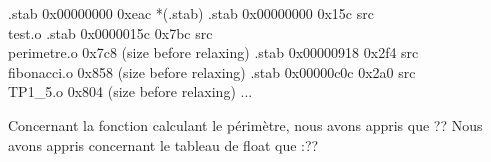 \documentclass[12pt,a4paper]{article}
\begin{document}
\begin{framed}
{.stab           0x00000000      0xeac\newline
 *(.stab)
 \color{blue}
 .stab          0x00000000      0x15c src\\test.o \newline
 .stab          0x0000015c      0x7bc src\\perimetre.o\newline
                                0x7c8 (size before relaxing)\newline
 .stab          0x00000918      0x2f4 src\\fibonacci.o\newline
                                0x858 (size before relaxing)\newline
 .stab          0x00000c0c      0x2a0 src\\TP1\_5.o\newline
                                0x804 (size before relaxing)\newline
\color{black}
...\newline
}
  
\end{framed}
Concernant la fonction calculant le périmètre, nous avons appris que ??
Nous avons appris concernant le tableau de float que :??
\end{document}
